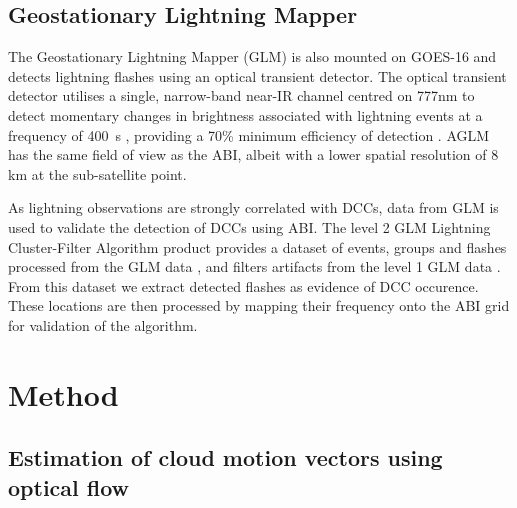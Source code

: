 \documentclass[amt, manuscript]{copernicus}
\begin{document}
\subsection{Geostationary Lightning Mapper}

The Geostationary Lightning Mapper (GLM) is also mounted on GOES-16 and detects lightning flashes using an optical transient detector.
The optical transient detector utilises a single, narrow-band near-IR channel centred on 777\unit{nm} \citep{orville_absolute_1984} to detect momentary changes in brightness associated with lightning events at a frequency of 400\unit{\mu s} \citep{christian_global_2003}, providing a 70\% minimum efficiency of detection \citep{goodman_goes-r_2013}.
AGLM has the same field of view as the ABI, albeit with a lower spatial resolution of 8 \unit{km} at the sub-satellite point.

As lightning observations are strongly correlated with DCCs, data from GLM is used to validate the detection of DCCs using ABI.
The level 2 GLM Lightning Cluster-Filter Algorithm product provides a dataset of events, groups and flashes processed from the GLM data \citep{peterson_research_2019}, and filters artifacts from the level 1 GLM data \citep{peterson_removing_2020}.
From this dataset we extract detected flashes as evidence of DCC occurence.
These locations are then processed by mapping their frequency onto the ABI grid for validation of the algorithm.

\section{Method}

\subsection{Estimation of cloud motion vectors using optical flow}
\end{document}
